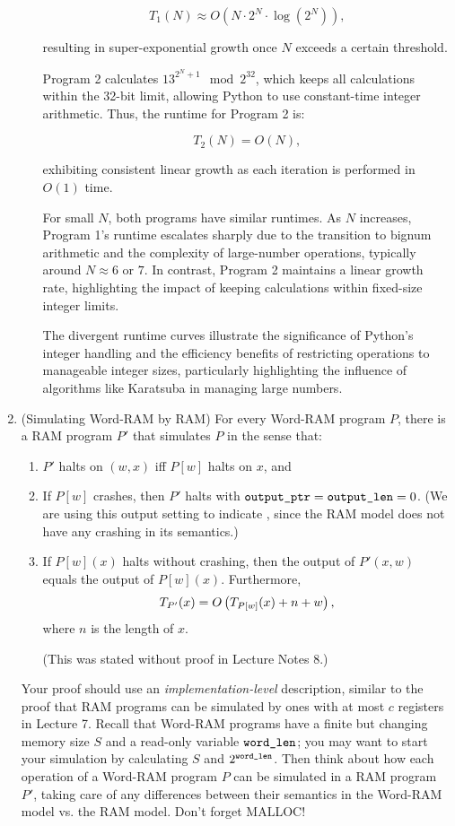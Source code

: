 \documentclass[11pt]{article}
\begin{document}
\begin{enumerate}
\begin{enumerate}
    $$
    T_1(N) \approx O(N \cdot 2^N \cdot \log(2^N)),
    $$
    
    resulting in super-exponential growth once $N$ exceeds a certain threshold.
    
    Program 2 calculates $13^{2^N + 1} \mod 2^{32}$, which keeps all calculations within the 32-bit limit, allowing Python to use constant-time integer arithmetic. Thus, the runtime for Program 2 is:
    
    $$
    T_2(N) = O(N),
    $$
    
    exhibiting consistent linear growth as each iteration is performed in $O(1)$ time.
    
    For small $N$, both programs have similar runtimes. As $N$ increases, Program 1's runtime escalates sharply due to the transition to bignum arithmetic and the complexity of large-number operations, typically around $N \approx 6$ or $7$. In contrast, Program 2 maintains a linear growth rate, highlighting the impact of keeping calculations within fixed-size integer limits.
    
    The divergent runtime curves illustrate the significance of Python's integer handling and the efficiency benefits of restricting operations to manageable integer sizes, particularly highlighting the influence of algorithms like Karatsuba in managing large numbers.
    
\end{enumerate}

\item (Simulating Word-RAM by RAM) For every Word-RAM program $P$, there is a RAM program $P'$ that simulates $P$ in the sense that:
\begin{enumerate}
    \item $P'$ halts on $(w,x)$ iff $P[w]$ halts on $x$, and 
    \item If $P[w]$ crashes, then $P'$ halts with $\texttt{output\_ptr}=\texttt{output\_len}=0$. (We are using this output setting to indicate \crash, since the RAM model does not have any crashing in its semantics.)
    \item If $P[w](x)$ halts without crashing, then the output of $P'(x,w)$ equals the output of $P[w](x)$.
     Furthermore,   
       $$T_{P'}(x) = O\left(T_{P[w]}(x)+n+w\right),$$
where $n$ is the length of $x$.

(This was stated without proof in Lecture Notes 8.) 

\end{enumerate}

Your proof should use an {\em implementation-level} description, similar to the proof that RAM programs can be simulated by ones with at most $c$ registers in Lecture 7.  Recall that Word-RAM programs have a finite but changing memory size $S$ and a read-only variable $\texttt{word\_len}$; you may want to start your simulation by calculating $S$ and $2^{\texttt{word\_len}}$.  Then think about how each operation of a Word-RAM program $P$ can be simulated in a RAM program $P'$, taking care of any differences between their semantics in the Word-RAM model vs. the RAM model. Don't forget MALLOC!


\end{enumerate}
\end{document}
